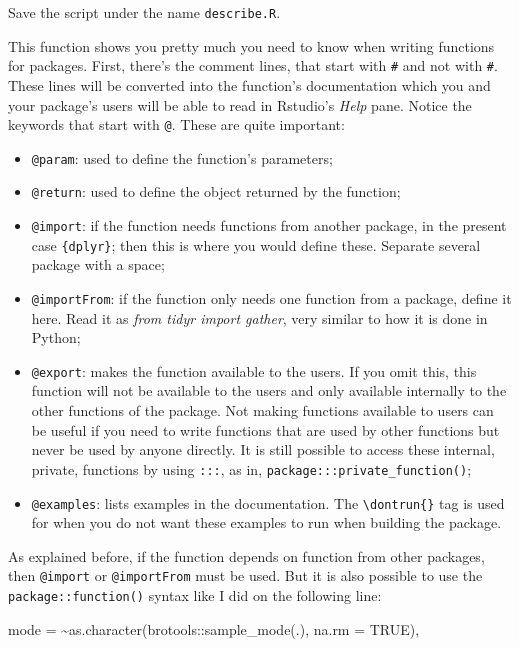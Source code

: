 \documentclass[
]{article}
\newenvironment{Shaded}{\begin{snugshade}}{\end{snugshade}}
\newcommand{\AttributeTok}[1]{\textcolor[rgb]{0.77,0.63,0.00}{#1}}
\newcommand{\ConstantTok}[1]{\textcolor[rgb]{0.00,0.00,0.00}{#1}}
\newcommand{\ErrorTok}[1]{\textcolor[rgb]{0.64,0.00,0.00}{\textbf{#1}}}
\newcommand{\FunctionTok}[1]{\textcolor[rgb]{0.00,0.00,0.00}{#1}}
\newcommand{\NormalTok}[1]{#1}
\newcommand{\OtherTok}[1]{\textcolor[rgb]{0.56,0.35,0.01}{#1}}
\newcommand{\SpecialCharTok}[1]{\textcolor[rgb]{0.00,0.00,0.00}{#1}}
\providecommand{\tightlist}{%
  \setlength{\itemsep}{0pt}\setlength{\parskip}{0pt}}
\begin{document}
Save the script under the name \texttt{describe.R}.

This function shows you pretty much you need to know when writing functions for packages. First,
there's the comment lines, that start with \texttt{\#\textquotesingle{}} and not with \texttt{\#}. These lines will be converted
into the function's documentation which you and your package's users will be able to read in
Rstudio's \emph{Help} pane. Notice the keywords that start with \texttt{@}. These are quite important:

\begin{itemize}
\tightlist
\item
  \texttt{@param}: used to define the function's parameters;
\item
  \texttt{@return}: used to define the object returned by the function;
\item
  \texttt{@import}: if the function needs functions from another package, in the present case \texttt{\{dplyr\}};
  then this is where you would define these. Separate several package with a space;
\item
  \texttt{@importFrom}: if the function only needs one function from a package, define it here. Read it as
  \emph{from tidyr import gather}, very similar to how it is done in Python;
\item
  \texttt{@export}: makes the function available to the users. If you omit this, this function will not
  be available to the users and only available internally to the other functions of the package. Not
  making functions available to users can be useful if you need to write functions that are used by
  other functions but never be used by anyone directly. It is still possible to access these internal,
  private, functions by using \texttt{:::}, as in, \texttt{package:::private\_function()};
\item
  \texttt{@examples}: lists examples in the documentation. The \texttt{\textbackslash{}dontrun\{\}} tag is used for when you do
  not want these examples to run when building the package.
\end{itemize}

As explained before, if the function depends on function from other packages, then \texttt{@import} or
\texttt{@importFrom} must be used. But it is also possible to use the \texttt{package::function()} syntax like
I did on the following line:

\begin{Shaded}
\begin{Highlighting}[]
\NormalTok{mode }\OtherTok{=} \ErrorTok{\textasciitilde{}}\FunctionTok{as.character}\NormalTok{(brotools}\SpecialCharTok{::}\FunctionTok{sample\_mode}\NormalTok{(.), }\AttributeTok{na.rm =} \ConstantTok{TRUE}\NormalTok{),}
\end{Highlighting}
\end{Shaded}
\end{document}
